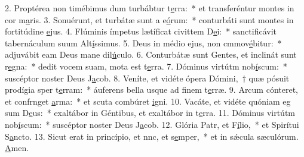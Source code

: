 2. Proptérea non timébimus dum turbábtur t\uline{e}rra:~* et transferéntur montes in cor m\uline{a}ris.
3. Sonuérunt, et turbátæ sunt a e\uline{ó}rum:~* conturbáti sunt montes in fortitúdine \uline{e}jus.
4. Flúminis ímpetus lætíficat civittem D\uline{e}i:~* sanctificávit tabernáculum suum Alt\uline{í}ssimus.
5. Deus in médio ejus, non cmmov\uline{é}bitur:~* adjuvábit eam Deus mane dil\uline{ú}culo.
6. Conturbátæ sunt Gentes, et inclinát sunt r\uline{e}gna:~* dedit vocem suam, mota est t\uline{e}rra.
7. Dóminus virtútm nob\uline{í}scum:~* suscéptor noster Deus J\uline{a}cob.
8. Veníte, et vidéte ópera Dómini,~† quæ pósuit prodígia sper t\uline{e}rram:~* áuferens bella usque ad finem t\uline{e}rræ.
9. Arcum cónteret, et confrnget \uline{a}rma:~* et scuta combúret \uline{i}gni.
10. Vacáte, et vidéte quóniam eg sum D\uline{e}us:~* exaltábor in Géntibus, et exaltábor in t\uline{e}rra.
11. Dóminus virtútm nob\uline{í}scum:~* suscéptor noster Deus J\uline{a}cob.
12. Glória Patr, et F\uline{í}lio,~* et Spirítui S\uline{a}ncto.
13. Sicut erat in princípio, et nnc, et s\uline{e}mper,~* et in sǽcula sæculórum. \uline{A}men.
